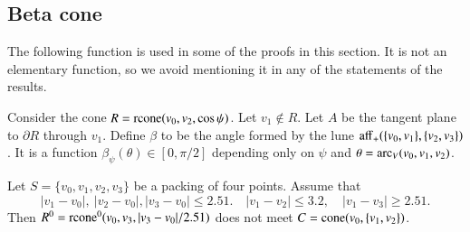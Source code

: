 \begin{tarskidata}
\section{Beta cone}
The following function is used in some of the proofs in this
section.  It is not an elementary function, so we avoid mentioning
it in any of the statements of the results.  
\begin{tarski}

\begin{definition}[$\beta$]
Consider the cone $R={\operatorname{rcone}}(v_0,v_2,\cos\psi)$.  
Let $v_1\not\in R$.  
Let $A$ be the tangent plane to $\partial R$ through $v_1$.
Define $\beta$ to be the angle formed by the lune
   ${\operatorname{aff}}_+(\{v_0,v_1\},\{v_2,v_3\})$. It is a function
$\beta_\psi(\theta)\in[0,\pi/2]$ depending only on $\psi$ and
$\theta = \operatorname{arc}_V(v_0,v_1,v_2)$.
\end{definition}
\end{tarski}





\begin{tarski}

\begin{lemma}
 Let $S=\{v_0,v_1,v_2,v_3\}$ be a packing of four points.
Assume
that 
  $$
    |v_1-v_0|,\ |v_2-v_0|, |v_3-v_0|\le 2.51.\quad 
    |v_1-v_2|\le 3.2,\quad |v_1-v_3|\ge 2.51.
   $$
Then $R^0={\operatorname{rcone}}^0(v_0,v_3,|v_3-v_0|/2.51)$ does not meet
$C={\operatorname{cone}}(v_0,\{v_1,v_2\})$.
\end{lemma}



\end{tarski}
\end{tarskidata}
